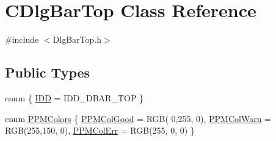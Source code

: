 \hypertarget{classCDlgBarTop}{
\section{CDlgBarTop Class Reference}
\label{classCDlgBarTop}
}


{\ttfamily \#include $<$DlgBarTop.h$>$}

\subsection*{Public Types}
\begin{DoxyCompactItemize}
\item 
enum \{ \hyperlink{classCDlgBarTop_acaea2ce7cd11634fc0395b7227ca85c8aaa5ea554f462d7ea2e0d833baffcb8f6}{IDD} =  IDD\_\-DBAR\_\-TOP
 \}
\item 
enum \hyperlink{classCDlgBarTop_a3e90ab41be984a877bba7ec8983ab0a9}{PPMColors} \{ \hyperlink{classCDlgBarTop_a3e90ab41be984a877bba7ec8983ab0a9ab54f380d9c45744b2396314e3059e3a9}{PPMColGood} =  RGB( 0,255, 0), 
\hyperlink{classCDlgBarTop_a3e90ab41be984a877bba7ec8983ab0a9af20b734571c6876003f537242654d351}{PPMColWarn} =  RGB(255,150, 0), 
\hyperlink{classCDlgBarTop_a3e90ab41be984a877bba7ec8983ab0a9ac52714d18db38ce24bc52c227e846c3e}{PPMColErr} =  RGB(255, 0, 0)
 \}
\end{DoxyCompactItemize}
